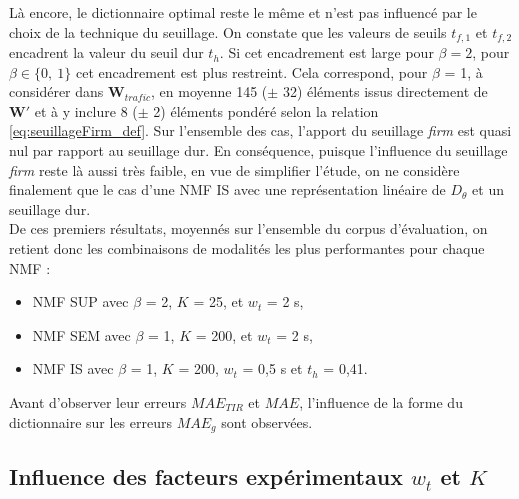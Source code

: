 Là encore, le dictionnaire optimal reste le même et n'est pas influencé par le choix de la technique du seuillage. On constate que les valeurs de seuils $t_{f,1}$ et $t_{f,2}$ encadrent la valeur du seuil dur $t_h$. Si cet encadrement est large pour $\beta = 2$, pour $\beta \in \lbrace 0,~1 \rbrace$ cet encadrement est plus restreint. Cela correspond, pour $\beta$ = 1, à considérer dans $\mathbf{W}_{trafic}$, en moyenne 145 ($\pm$ 32) éléments issus directement de $\mathbf{W'}$ et à y inclure 8 ($\pm$ 2) éléments pondéré selon la relation \ref{eq:seuillageFirm_def}. Sur l'ensemble des cas, l'apport du seuillage \textit{firm} est quasi nul par rapport au seuillage dur. En conséquence, puisque l'influence du seuillage \textit{firm} reste là aussi très faible, en vue de simplifier l'étude, on ne considère finalement que le cas d'une NMF IS avec une représentation linéaire de $D_{\theta}$ et un seuillage dur. \\

De ces premiers résultats, moyennés sur l'ensemble du corpus d'évaluation, on retient donc les combinaisons de modalités les plus performantes pour chaque NMF :

\begin{itemize}
\item NMF SUP avec $\beta$ = 2, $K$ = 25, et $w_t$ = 2 s,
\item NMF SEM avec $\beta$ = 1, $K$ = 200, et $w_t$ = 2 s,
\item NMF IS avec $\beta$ = 1, $K$ = 200, $w_t$ = 0,5 s et $t_h$ = 0,41.\\
\end{itemize}

Avant d'observer leur erreurs $MAE_{TIR}$ et $MAE$, l'influence de la forme du dictionnaire sur les erreurs $MAE_g$ sont observées.

\subsection{Influence des facteurs expérimentaux $w_t$ et $K$}

